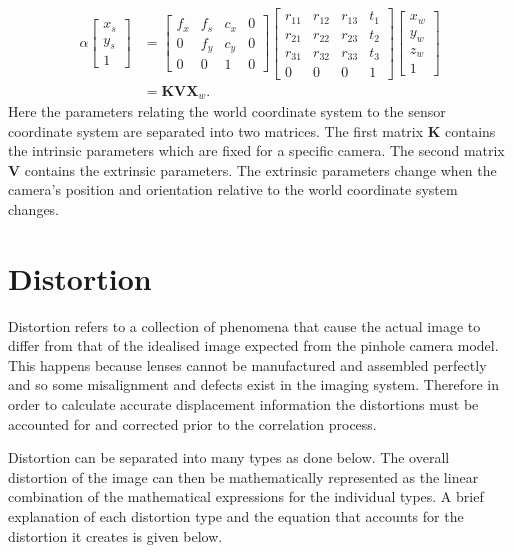 \begin{align}
	\alpha
	\begin{bmatrix}
	x_s \\
	y_s \\
	1
	\end{bmatrix} &=
	\begin{bmatrix}
	f_x & f_s & c_x & 0\\
	0 & f_y & c_y & 0\\
	0 & 0 & 1 & 0
	\end{bmatrix}
	\begin{bmatrix}
	r_{11} & r_{12} & r_{13} & t_1 \\
	r_{21} & r_{22} & r_{23} & t_2 \\
	r_{31} & r_{32} & r_{33} & t_3 \\
	0 & 0 & 0 & 1
	\end{bmatrix}
	\begin{bmatrix}
	x_w \\
	y_w \\
	z_w \\
	1
	\end{bmatrix} \\
	&= \bm{K} \bm{V} \bm{X}_w.
	\label{eq:world 2 sensor}
\end{align}
Here the parameters relating the world coordinate system to the sensor coordinate system are separated into two matrices. The first matrix $\bm{K}$ contains the intrinsic parameters which are fixed for a specific camera. The second matrix $\bm{V}$ contains the extrinsic parameters. The extrinsic parameters change when the camera's position and orientation relative to the world coordinate system changes.

\section{Distortion}
Distortion refers to a collection of phenomena that cause the actual image to differ from that of the idealised image expected from the pinhole camera model. This happens because lenses cannot be manufactured and assembled perfectly and so some misalignment and defects exist in the imaging system. Therefore in order to calculate accurate displacement information the distortions must be accounted for and corrected prior to the correlation process.

Distortion can be separated into many types as done below. The overall distortion of the image can then be mathematically represented as the linear combination of the mathematical expressions for the individual types. A brief explanation of each distortion type and the equation that accounts for the distortion it creates is given below.

